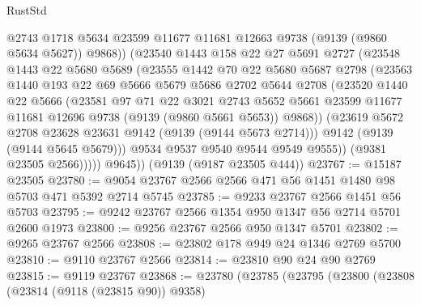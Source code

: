 \begin{lexlean}{RustStd}
\begin{coremodule}
                  @2743
                  @1718
                  @5634
                  @23599
                  @11677
                  @11681
                  @12663
                  @9738
                  (@9139 (@9860 @5634 @5627))
                  @9868))
              (@23540
                @1443
                @158
                @22
                @27
                @5691
                @2727
                (@23548
                  @1443
                  @22
                  @5680
                  @5689
                  (@23555
                    @1442
                    @70
                    @22
                    @5680
                    @5687
                    @2798
                    (@23563
                      @1440
                      @193
                      @22
                      @69
                      @5666
                      @5679
                      @5686
                      @2702
                      @5644
                      @2708
                      (@23520
                        @1440
                        @22
                        @5666
                        (@23581
                          @97
                          @71
                          @22
                          @3021
                          @2743
                          @5652
                          @5661
                          @23599
                          @11677
                          @11681
                          @12696
                          @9738
                          (@9139 (@9860 @5661 @5653))
                          @9868))
                      (@23619 @5672 @2708 @23628 @23631 @9142 (@9139 (@9144 @5673 @2714)))
                      @9142
                      (@9139 (@9144 @5645 @5679)))
                    @9534
                    @9537
                    @9540
                    @9544
                    @9549
                    @9555))
                (@9381 @23505 @2566)))))
        @9645))
    (@9139 (@9187 @23505 @444))
@23767 := @15187 @23505
@23780 := @9054 @23767 @2566 @2566 @471 @56 @1451 @1480 @98 @5703 @471 @5392 @2714 @5745
@23785 := @9233 @23767 @2566 @1451 @56 @5703
@23795 := @9242 @23767 @2566 @1354 @950 @1347 @56 @2714 @5701 @2600 @1973
@23800 := @9256 @23767 @2566 @950 @1347 @5701
@23802 := @9265 @23767 @2566
@23808 := @23802 @178 @949 @24 @1346 @2769 @5700
@23810 := @9110 @23767 @2566
@23814 := @23810 @90 @24 @90 @2769
@23815 := @9119 @23767
@23868 := @23780
    (@23785
      (@23795
        (@23800
          (@23808
            (@23814 (@9118 (@23815 @90)) @9358)

\end{coremodule}
\end{lexlean}
